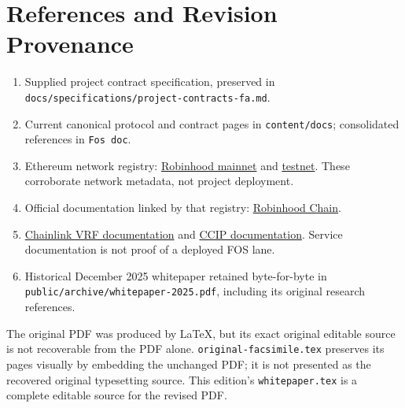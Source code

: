 \documentclass[
  10pt,
  letterpaper,
]{article}
\providecommand{\tightlist}{%
  \setlength{\itemsep}{0pt}\setlength{\parskip}{0pt}}
\begin{document}
\section{References and Revision
Provenance}\label{references-and-revision-provenance}

\begin{enumerate}
\def\labelenumi{\arabic{enumi}.}
\tightlist
\item
  Supplied project contract specification, preserved in
  \texttt{docs/specifications/project-contracts-fa.md}.
\item
  Current canonical protocol and contract pages in
  \texttt{content/docs}; consolidated references in \texttt{Fos\ doc}.
\item
  Ethereum network registry:
  \href{https://github.com/ethereum-lists/chains/blob/master/_data/chains/eip155-4663.json}{Robinhood
  mainnet} and
  \href{https://github.com/ethereum-lists/chains/blob/master/_data/chains/eip155-46630.json}{testnet}.
  These corroborate network metadata, not project deployment.
\item
  Official documentation linked by that registry:
  \href{https://docs.robinhood.com/chain}{Robinhood Chain}.
\item
  \href{https://docs.chain.link/vrf}{Chainlink VRF documentation} and
  \href{https://docs.chain.link/ccip}{CCIP documentation}. Service
  documentation is not proof of a deployed FOS lane.
\item
  Historical December 2025 whitepaper retained byte-for-byte in
  \texttt{public/archive/whitepaper-2025.pdf}, including its original
  research references.
\end{enumerate}

The original PDF was produced by LaTeX, but its exact original editable
source is not recoverable from the PDF alone.
\texttt{original-facsimile.tex} preserves its pages visually by
embedding the unchanged PDF; it is not presented as the recovered
original typesetting source. This edition's \texttt{whitepaper.tex} is a
complete editable source for the revised PDF.
\end{document}
